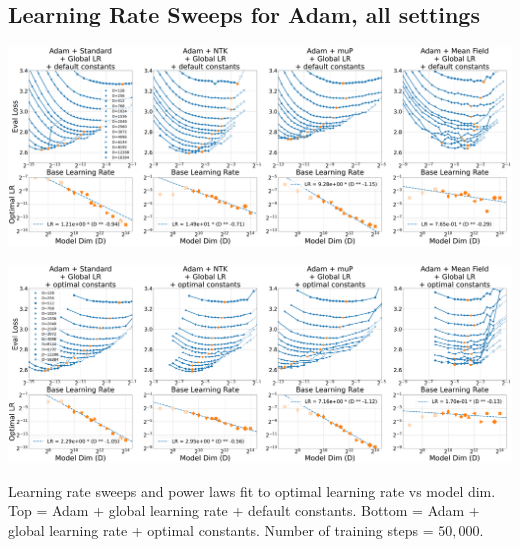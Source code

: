 \documentclass{article}
\theoremstyle{plain}
\theoremstyle{definition}
\theoremstyle{remark}
\begin{document}
\clearpage
\thispagestyle{plain}
\begin{SidewaysFigure}
\subsection{Learning Rate Sweeps for Adam, all settings}
\label{sec:app_lr_sweeps_adam}
\vspace{12pt}
\includegraphics[width=0.98\linewidth]{icml2024/figures/lr_sweeps/appendix/adam/adam+50k_steps.pdf}

\figvspace

\includegraphics[width=0.98\linewidth]{icml2024/figures/lr_sweeps/appendix/adam/adam+50k_steps_optimal_constants_only.pdf}
\caption{Learning rate sweeps and power laws fit to optimal learning rate vs model dim. Top = Adam + global learning rate + default constants. Bottom = Adam + global learning rate + optimal constants. Number of training steps = $50{,}000$.}
\end{SidewaysFigure}
\clearpage
\end{document}
